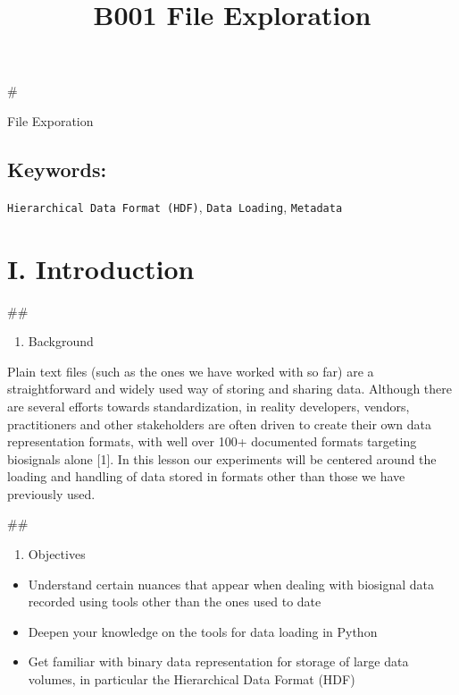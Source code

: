 \documentclass[11pt]{article}
\title{B001 File Exploration}
\providecommand{\tightlist}{%
      \setlength{\itemsep}{0pt}\setlength{\parskip}{0pt}}
\begin{document}
    
    
    \maketitle
    
    

    
    \#

 { File Exporation }

    \subsection{\texorpdfstring{{ Keywords: }}{ Keywords: }}\label{keywords}

    \texttt{Hierarchical\ Data\ Format\ (HDF)}, \texttt{Data\ Loading},
\texttt{Metadata}

    \section{I. Introduction}\label{i.-introduction}

    \#\#

\begin{enumerate}
\def\labelenumi{\arabic{enumi}.}
\tightlist
\item
  Background
\end{enumerate}

    Plain text files (such as the ones we have worked with so far) are a
straightforward and widely used way of storing and sharing data.
Although there are several efforts towards standardization, in reality
developers, vendors, practitioners and other stakeholders are often
driven to create their own data representation formats, with well over
100+ documented formats targeting biosignals alone {[}1{]}. In this
lesson our experiments will be centered around the loading and handling
of data stored in formats other than those we have previously used.

    \#\#

\begin{enumerate}
\def\labelenumi{\arabic{enumi}.}
\setcounter{enumi}{1}
\tightlist
\item
  Objectives
\end{enumerate}

\begin{itemize}
\tightlist
\item
  Understand certain nuances that appear when dealing with biosignal
  data recorded using tools other than the ones used to date
\item
  Deepen your knowledge on the tools for data loading in Python
\item
  Get familiar with binary data representation for storage of large data
  volumes, in particular the Hierarchical Data Format (HDF)
\end{itemize}
\end{document}
